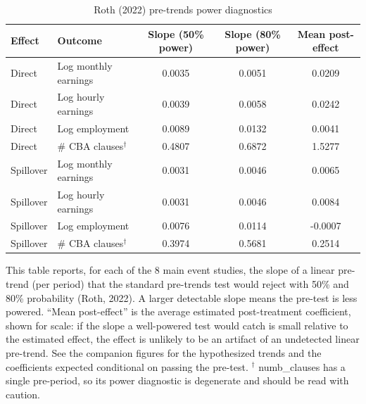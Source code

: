 \begin{table}[H]
\centering
\scriptsize
\caption{Roth (2022) pre-trends power diagnostics}
\label{tab:pretrends_slopes}
\begin{tabular}{llccc}
\hline\hline
Effect & Outcome & Slope (50\% power) & Slope (80\% power) & Mean post-effect \\
\hline
Direct & Log monthly earnings & 0.0035 & 0.0051 & 0.0209 \\
Direct & Log hourly earnings & 0.0039 & 0.0058 & 0.0242 \\
Direct & Log employment & 0.0089 & 0.0132 & 0.0041 \\
Direct & # CBA clauses$^{\dagger}$ & 0.4807 & 0.6872 & 1.5277 \\
\hline
Spillover & Log monthly earnings & 0.0031 & 0.0046 & 0.0065 \\
Spillover & Log hourly earnings & 0.0031 & 0.0046 & 0.0084 \\
Spillover & Log employment & 0.0076 & 0.0114 & -0.0007 \\
Spillover & # CBA clauses$^{\dagger}$ & 0.3974 & 0.5681 & 0.2514 \\
\hline
\end{tabular}
\begin{minipage}{0.92\textwidth}\scriptsize This table reports, for each of the 8 main event studies, the slope of a linear pre-trend (per period) that the standard pre-trends test would reject with 50\% and 80\% probability (Roth, 2022). A larger detectable slope means the pre-test is less powered. ``Mean post-effect'' is the average estimated post-treatment coefficient, shown for scale: if the slope a well-powered test would catch is small relative to the estimated effect, the effect is unlikely to be an artifact of an undetected linear pre-trend. See the companion figures for the hypothesized trends and the coefficients expected conditional on passing the pre-test. $^{\dagger}$ numb\_clauses has a single pre-period, so its power diagnostic is degenerate and should be read with caution.\end{minipage}
\end{table}